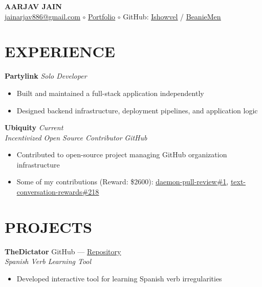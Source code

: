 \documentclass[11pt]{article}
\begin{document}
\begin{center}
{\LARGE \textbf{AARJAV JAIN}}\\[4pt]

\href{mailto:jainarjav886@gmail.com}{\underline{jainarjav886@gmail.com}} $\circ$
\href{https://beanie-man.vercel.app}{\underline{Portfolio}} $\circ$
GitHub: \href{https://github.com/Ishowvel}{\underline{Ishowvel}} / \href{https://github.com/BeanieMen}{\underline{BeanieMen}}

\end{center}

\section*{EXPERIENCE}

\textbf{Partylink} \hfill \textit{Solo Developer}
\begin{itemize}
\item Built and maintained a full-stack application independently
\item Designed backend infrastructure, deployment pipelines, and application logic
\end{itemize}

\vspace{6pt}

\textbf{Ubiquity} \hfill \textit{Current}\\
\textit{Incentivized Open Source Contributor} \hfill \textit{GitHub}
\begin{itemize}
\item Contributed to open-source project managing GitHub organization infrastructure
\item Some of my contributions (Reward: \$2600):
\href{https://github.com/ubiquity-os-marketplace/daemon-pull-review/pull/1}{\underline{daemon-pull-review\#1}},
\href{https://github.com/ubiquity-os-marketplace/text-conversation-rewards/pull/218}{\underline{text-conversation-rewards\#218}}
\end{itemize}

\section*{PROJECTS}

\textbf{TheDictator} \hfill GitHub ---
\href{https://github.com/BeanieMen/thedictator}{\underline{Repository}}\\
\textit{Spanish Verb Learning Tool}
\begin{itemize}
\item Developed interactive tool for learning Spanish verb irregularities
\end{itemize}
\end{document}
